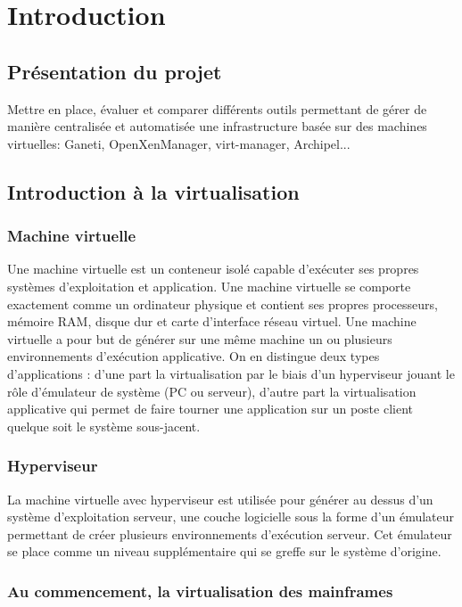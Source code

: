 \chapter{Introduction}
\section{Présentation du projet}
Mettre en place, évaluer et comparer différents outils permettant de gérer de manière
centralisée et automatisée une infrastructure basée sur des machines virtuelles: Ganeti,
OpenXenManager, virt-manager, Archipel...
\section{Introduction à la virtualisation}
\subsection{Machine virtuelle}


Une machine virtuelle est un conteneur isolé capable d'exécuter
ses propres systèmes d'exploitation et application.
Une machine virtuelle se comporte exactement comme un ordinateur physique
et contient ses propres processeurs, mémoire RAM, disque dur et carte
d'interface réseau virtuel. Une machine virtuelle
a pour but de générer sur une même machine un ou plusieurs environnements
d'exécution applicative. On en distingue deux types d'applications
: d'une part la virtualisation par le biais d'un hyperviseur jouant
le rôle d'émulateur de système (PC ou serveur), d'autre part la virtualisation
applicative qui permet de faire tourner une application sur un poste
client quelque soit le système sous-jacent.

\subsection{Hyperviseur }


La machine virtuelle avec hyperviseur est utilisée pour générer au
dessus d'un système d'exploitation serveur, une couche logicielle sous
la forme d'un émulateur permettant de créer plusieurs environnements
d'exécution serveur. Cet émulateur se place comme un niveau supplémentaire qui se greffe sur le système d'origine.
\newpage
\subsection{Au commencement, la virtualisation des mainframes}

